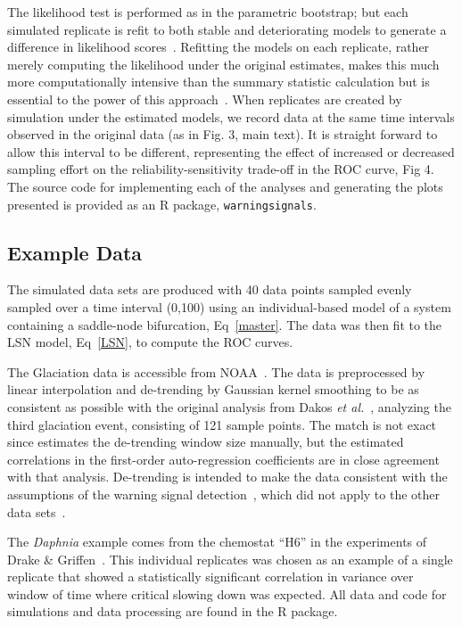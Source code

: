 \documentclass[authoryear,preprint,11pt]{elsarticle}
\begin{document}
The likelihood test is performed as in the parametric bootstrap; 
but each simulated replicate is refit to both stable and deteriorating models to generate a difference in likelihood scores~\citep{Cox1961}.
Refitting the models on each replicate, 
rather merely computing the likelihood under the original estimates,
makes this much more computationally intensive than the summary statistic calculation but is essential to the power of this approach~\citep{Huelsenbeck1996}.
When replicates are created by simulation under the estimated models,
we record data at the same time intervals observed in the original data (as in Fig. 3, main text). 
It is straight forward to allow this interval to be different,
representing the effect of increased or decreased sampling effort on the reliability-sensitivity trade-off in the ROC curve, Fig 4.
The source code for implementing each of the analyses and generating the plots presented is provided as an R package, \verb|warningsignals|. 

\subsection{Example Data}
The simulated data sets are produced with 40 data points
sampled evenly sampled over a time interval (0,100) using an individual-based model of a system containing a saddle-node bifurcation, Eq~\eqref{master}.
The data was then fit to the LSN model, Eq~\eqref{LSN}, to compute the ROC curves. 

The Glaciation data is accessible from NOAA~\citep{Petit1999}.
The data is preprocessed by linear interpolation and de-trending by Gaussian kernel smoothing 
to be as consistent as possible with the original analysis from Dakos \emph{et al.}~\citep{Dakos2008},
analyzing the third glaciation event, consisting of 121 sample points. 
The match is not exact since estimates the de-trending window size manually,
but the estimated correlations in the first-order auto-regression coefficients are in close agreement with that analysis. 
De-trending is intended to make the data consistent with the assumptions of the warning signal detection~\citep{Dakos2008}, 
which did not apply to the other data sets~\citep{Drake2010}.  

The \emph{Daphnia} example comes from the chemostat ``H6'' in the experiments of Drake \& Griffen~\citep{Drake2010}. 
This individual replicates was chosen as an example of a single replicate 
that showed a statistically significant correlation in variance over window of time where critical slowing down was expected.  All data and code for simulations and data processing are found in the R package.  
\end{document}
